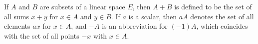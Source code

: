 If $A$ and $B$ are subsets of a linear space $E$, then $A + B$ is defined to be the set of all sums $x + y$ for $x \in A$ and $y \in B$. If $a$ is a scalar, then $aA$ denotes the set of all elements $a x$ for $x \in A$, and $-A$ is an abbreviation for $(-1)A$, which coincides with the set of all points $-x$ with $x \in A$.
